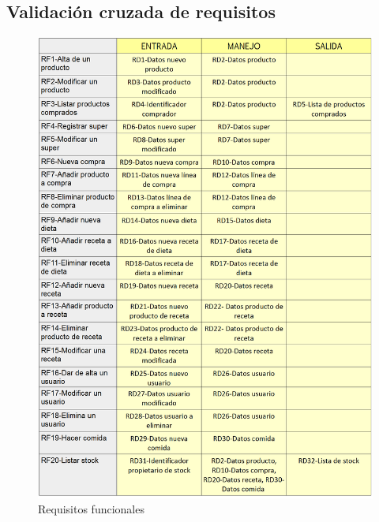 \documentclass[a4paper,12pt]{report}
\begin{document}
\subsection{\textbf{Validación cruzada de requisitos}}
\label{sec-2-2-32}
\begin{figure}[!htp]
\centering
\includegraphics[width=0.9\linewidth]{./refinamientos/tablaRF1.png}
\caption{Requisitos funcionales}
\label{fig:Requisitos funcionales}
\medskip
\footnotesize
{}
\end{figure}
\end{document}
